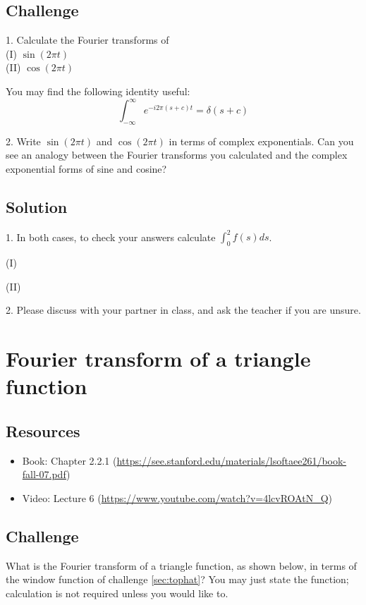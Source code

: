 \subsection*{Challenge}
1. Calculate the Fourier transforms of\\
(I) $\sin(2 \pi t)$\\
(II) $\cos(2 \pi t)$

You may find the following identity useful:
\begin{equation}
    \int_{-\infty}^{\infty} e^{-i 2 \pi (s+c) t} = \delta(s+c)
\end{equation}

2. Write $\sin(2 \pi t)$ and $\cos(2 \pi t)$ in terms of complex exponentials. Can you see an analogy between the Fourier transforms you calculated and the complex exponential forms of sine and cosine?

\subsection*{Solution}
1. In both cases, to check your answers calculate $\int_0^2 f(s) ds$.

(I)\\

(II)\\

2. Please discuss with your partner in class, and ask the teacher if you are unsure.



\iffalse
\newpage
\section{Fourier transform of a triangle function}
\label{sec:ft_triangle}

\subsection*{Resources}
\begin{itemize}
    \item Book: Chapter 2.2.1 (\url{https://see.stanford.edu/materials/lsoftaee261/book-fall-07.pdf})
    \item Video: Lecture 6 (\url{https://www.youtube.com/watch?v=4lcvROAtN_Q})
\end{itemize}

\subsection*{Challenge}
What is the Fourier transform of a triangle function, as shown below, in terms of the window function of challenge \ref{sec:tophat}? You may just state the function; calculation is not required unless you would like to.

